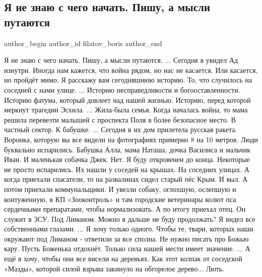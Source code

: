  
 
 
 
 
 
\subsection{Я не знаю с чего начать. Пишу, а мысли путаются}
\label{sec:29_09_2022.fb.filatov_boris.1.s_chego_nachat}
 

\ifcmt
 author_begin
   author_id filatov_boris
 author_end
\fi

Я не знаю с чего начать.
Пишу, а мысли путаются.
...
Сегодня я увидел Ад изнутри.
Иногда нам кажется, что война рядом, но нас не касается.
Или касается, но пройдёт мимо.
Я расскажу вам сегодняшнюю историю.
То, что случилось на соседней с нами улице.
... 
Историю несправедливости и богооставленности.
Историю фатума, который довлеет над нашей жизнью.
Историю, перед которой меркнут трагедии Эсхила.
...
Жила-была семья. 
Когда началась война, то мама решила перевезти малышей с проспекта Поля в более безопасное место.
В частный сектор. К бабушке.
...
Сегодня в их дом прилетела русская ракета.
Воронка, которую вы все видели на фотографиях примерно 8 на 10 метров.
Люди буквально испарились. Бабушка Алла, мама Наташа, дочка Василиса  и мальчик Иван.
И маленькая собачка Джек.
Нет. Я буду откровенен до конца. Некоторые не просто испарились.
Их нашли у соседей на крышах. 
На соседних улицах.
А когда приехали спасатели, то на развалинах сидел старый пёс Крым.
И выл.
А потом приехали коммунальщики. 
И увезли собаку, оглохшую, ослепшую и контуженную, в КП «Зооконтроль» и там городские ветеринары колют пса сердечными препаратами, чтобы нормализовать.
А по итогу приехал отец.
Он служит в ЗСУ. Под Лиманом.
Можно я дальше не буду продолжать?
Я видел все собственными глазами.
...
Я хочу только одного.
Чтобы те, твари, которых наши окружают под Лиманом - ответили за все сполна.
Не нужно писать про Божью кару.
Пусть Боженька отдохнёт.
Только сила нашей мести имеет значение.
...
А ещё я хочу, чтобы они все висели на деревьях.
Как этот колпак от соседской «Мазды», которой силой взрыва закинуло на обгорелое дерево...
Лють.


